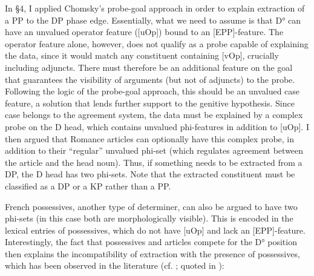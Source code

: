 \documentclass[output=paper]{langsci/langscibook}
\begin{document}
In §4, I applied Chomsky’s probe-goal approach in order to explain extraction of a PP to the DP phase edge. Essentially, what we need to assume is that D° can have an unvalued operator feature ([uOp]) bound to an [EPP]-feature. The operator feature alone, however, does not qualify as a probe capable of explaining the data, since it would match any constituent containing [vOp], crucially including adjuncts. There must therefore be an additional feature on the goal that guarantees the visibility of arguments (but not of adjuncts) to the probe. Following the logic of the probe-goal approach, this should be an unvalued case feature, a solution that lends further support to the genitive hypothesis. Since case belongs to the agreement system, the data must be explained by a complex probe on the D head, which contains unvalued phi-features in addition to [uOp]. I then argued that Romance articles can optionally have this complex probe, in addition to their “regular” unvalued phi-set (which regulates agreement between the article and the head noun). Thus, if something needs to be extracted from a DP, the D head has two phi-sets. Note that the extracted constituent must be classified as a DP or a KP rather than a PP.

French possessives, another type of determiner, can also be argued to have two phi-sets (in this case both are morphologically visible). This is encoded in the lexical entries of possessives, which do not have [uOp] and lack an [EPP]-feature. Interestingly, the fact that possessives and articles compete for the D° position then explains the incompatibility of extraction with the presence of possessives, which has been observed in the literature (cf. \citealt{Milner1978,Milner1982}; quoted in \citealt{Sag1994}):

\ea%
    \label{ex:mensch:32}
    \z
\z
\end{document}
